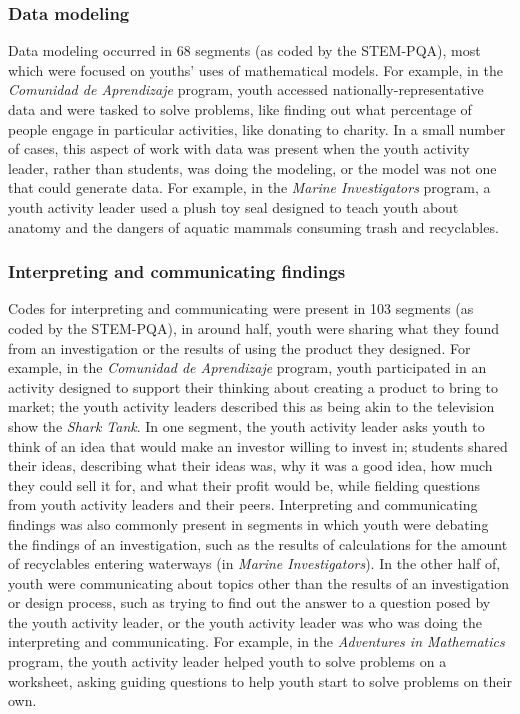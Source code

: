 \documentclass[]{book}
\theoremstyle{definition}
\theoremstyle{definition}
\theoremstyle{definition}
\theoremstyle{remark}
\begin{document}
\subsubsection{Data modeling}\label{data-modeling}

Data modeling occurred in 68 segments (as coded by the STEM-PQA), most
which were focused on youths' uses of mathematical models. For example,
in the \emph{Comunidad de Aprendizaje} program, youth accessed
nationally-representative data and were tasked to solve problems, like
finding out what percentage of people engage in particular activities,
like donating to charity. In a small number of cases, this aspect of
work with data was present when the youth activity leader, rather than
students, was doing the modeling, or the model was not one that could
generate data. For example, in the \emph{Marine Investigators} program,
a youth activity leader used a plush toy seal designed to teach youth
about anatomy and the dangers of aquatic mammals consuming trash and
recyclables.

\subsubsection{Interpreting and communicating
findings}\label{interpreting-and-communicating-findings}

Codes for interpreting and communicating were present in 103 segments
(as coded by the STEM-PQA), in around half, youth were sharing what they
found from an investigation or the results of using the product they
designed. For example, in the \emph{Comunidad de Aprendizaje} program,
youth participated in an activity designed to support their thinking
about creating a product to bring to market; the youth activity leaders
described this as being akin to the television show the \emph{Shark
Tank}. In one segment, the youth activity leader asks youth to think of
an idea that would make an investor willing to invest in; students
shared their ideas, describing what their ideas was, why it was a good
idea, how much they could sell it for, and what their profit would be,
while fielding questions from youth activity leaders and their peers.
Interpreting and communicating findings was also commonly present in
segments in which youth were debating the findings of an investigation,
such as the results of calculations for the amount of recyclables
entering waterways (in \emph{Marine Investigators}). In the other half
of, youth were communicating about topics other than the results of an
investigation or design process, such as trying to find out the answer
to a question posed by the youth activity leader, or the youth activity
leader was who was doing the interpreting and communicating. For
example, in the \emph{Adventures in Mathematics} program, the youth
activity leader helped youth to solve problems on a worksheet, asking
guiding questions to help youth start to solve problems on their own.
\end{document}
